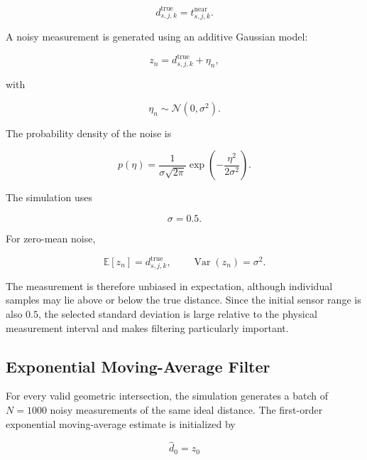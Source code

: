 \documentclass[10pt,twocolumn,a4paper]{article}
\begin{document}
\begin{equation}
    d^{\mathrm{true}}_{s,j,k}
    =
    t^{\mathrm{near}}_{s,j,k}.
    \label{eq:true_sensor_distance}
\end{equation}

A noisy measurement is generated using an additive Gaussian model:

\begin{equation}
    z_n
    =
    d^{\mathrm{true}}_{s,j,k}+\eta_n,
    \label{eq:noisy_measurement}
\end{equation}

with

\begin{equation}
    \eta_n\sim\mathcal{N}(0,\sigma^2).
    \label{eq:gaussian_noise}
\end{equation}

The probability density of the noise is

\begin{equation}
    p(\eta)
    =
    \frac{1}{\sigma\sqrt{2\pi}}
    \exp\left(-\frac{\eta^2}{2\sigma^2}\right).
    \label{eq:gaussian_density}
\end{equation}

The simulation uses

\[
    \sigma=0.5.
\]

For zero-mean noise,

\begin{equation}
    \mathbb{E}[z_n]=d^{\mathrm{true}}_{s,j,k},
    \qquad
    \operatorname{Var}(z_n)=\sigma^2.
    \label{eq:measurement_statistics}
\end{equation}

The measurement is therefore unbiased in expectation, although
individual samples may lie above or below the true distance. Since the
initial sensor range is also $0.5$, the selected standard deviation is
large relative to the physical measurement interval and makes filtering
particularly important.

\subsection{Exponential Moving-Average Filter}

For every valid geometric intersection, the simulation generates a
batch of $N=1000$ noisy measurements of the same ideal distance. The
first-order exponential moving-average estimate is initialized by

\begin{equation}
    \hat{d}_0=z_0
    \label{eq:filter_initialization}
\end{equation}
\end{document}
